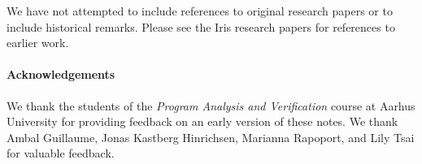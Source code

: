 We have not attempted to include references to original research papers or to include
historical remarks. Please see the Iris research papers for references to earlier work.

\paragraph{Acknowledgements}
We thank the students of the \emph{Program Analysis and Verification} course at Aarhus University for providing feedback on an early version of these notes.
We thank Ambal Guillaume, Jonas Kastberg Hinrichsen, Marianna Rapoport, and Lily Tsai for valuable feedback.

